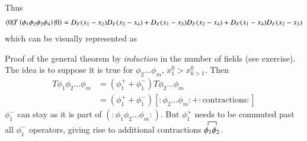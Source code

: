 Thus 
\begin{align*}
	\braket{0 | T \left(\phi_1 \phi_2 \phi_3 \phi_4 \right) | 0} = D_F (x_1 - x_2) D_F(x_3 - x_4) + D_F (x_1 - x_3) D_F(x_2 - x_4) + D_F (x_1 - x_4) D_F(x_2 - x_3) 
\end{align*}
which can be visually represented as
\begin{center}
\end{center}

Proof of the general theorem by \textit{induction} in the number of fields (see exercise). The idea is to suppose it is true for $\phi_2 \dots \phi_m$, $x^0_1 > x^0_{k>1}$. Then 
\begin{align*}
	T\phi_1 \phi_2 \dots \phi_m &= (\phi^+_{1} + \phi^-_{1})T\phi_2 \dots \phi_m \\
								& = (\phi^+_{1} + \phi^-_{1}) [:\phi_2 \dots \phi_m: + :\text{contractions}:]
\end{align*}
$\phi^-_1$ can stay as it is part of $(:\phi_1 \phi_2 \dots \phi_m:)$. But $\phi^+_1$ needs to be commuted past all $\phi^-_1$ operators, giving rise to additional contractions $\contraction{}{\phi_1}{}{\phi_2} \phi_1\phi_2$.

